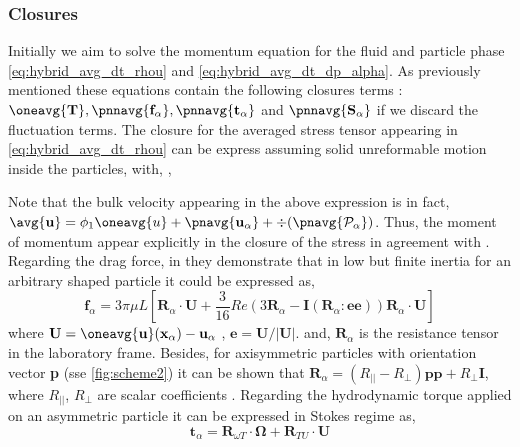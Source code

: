 \subsubsection*{Closures}
Initially we aim to solve the momentum equation for the fluid and particle phase \ref{eq:hybrid_avg_dt_rhou} and \ref{eq:hybrid_avg_dt_dp_alpha}. 
As previously mentioned these equations contain the following closures terms : $\oneavg{\textbf{T}}, \pnnavg{\textbf{f}_\alpha}, \pnnavg{\textbf{t}_\alpha}$ and $\pnnavg{\textbf{S}_\alpha}$ if we discard the fluctuation terms.
The closure for the averaged stress tensor appearing in \ref{eq:hybrid_avg_dt_rhou} can be express assuming solid unreformable motion inside the particles, with, \citep{jackson1997locally},



Note that the bulk velocity appearing in the above expression is in fact, $\avg{\textbf{u}} = \phi_1\oneavg{u} + \pnavg{\textbf{u}_\alpha} + \div (\pnavg{\mathcal{P}_\alpha})$.
Thus, the moment of momentum appear explicitly in the closure of the stress in agreement with \citet{zhang1997momentum}.  
Regarding the drag force, in  \citet{brenner1963resistance} they demonstrate that in low but finite inertia for an arbitrary shaped particle it could be expressed as,
\begin{equation}
    \textbf{f}_\alpha = 3 \pi \mu L \left[
        \textbf{R}_\alpha \cdot \textbf{U}
        + \frac{3}{16} Re  \left(
            3 \textbf{R}_\alpha 
            - \textbf{I} (\textbf{R}_\alpha : \textbf{e} \textbf{e})
        \right)
        \textbf{R}_\alpha\cdot  \textbf{U}
    \right]
\end{equation}
where $\textbf{U} = \oneavg{\textbf{u}}(\textbf{x}_\alpha)  - \textbf{u}_\alpha$ , $\textbf{e} = \textbf{U}/|\textbf{U}|$. 
and,  $\textbf{R}_\alpha$ is the resistance tensor in the laboratory frame. 
Besides, for axisymmetric particles with orientation vector \textbf{p} (sse \ref{fig:scheme2}) it can be shown that $\textbf{R}_\alpha = (R_{||} - R_\bot) \textbf{pp} + R_\bot \textbf{I}$, where $R_{||}$, $R_\bot$ are scalar coefficients \citep{guazzelli2011,kim2013microhydrodynamics}. 
Regarding the hydrodynamic torque applied on an asymmetric particle it can be expressed in Stokes regime as, 
\begin{equation}
    \textbf{t}_\alpha 
    = 
    \textbf{R}_{\omega T}\cdot \mathbf{\Omega}
     + \textbf{R}_{TU} \cdot \textbf{U} 
\end{equation}

